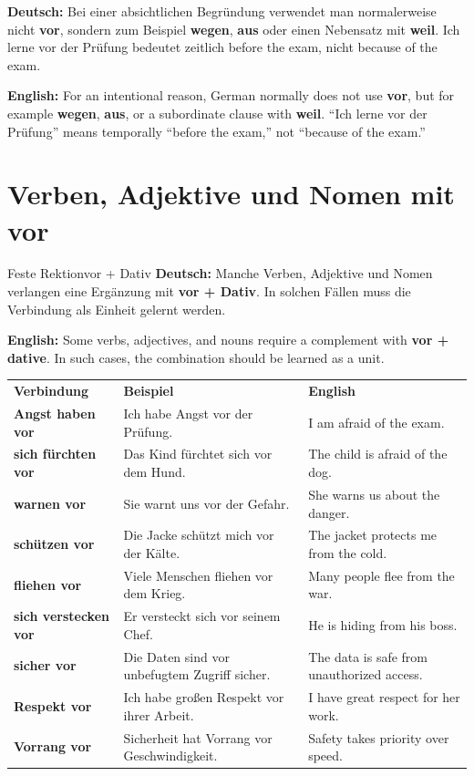 \documentclass[a4paper,11pt]{article}
\newcommand{\GermanText}[1]{\textbf{Deutsch: }#1\par}
\newcommand{\EnglishText}[1]{{\small\color{SoftGray}\textbf{English: }#1\par}}
\begin{document}
        \begin{warningbox}
            \GermanText{Bei einer absichtlichen Begründung verwendet man normalerweise nicht \textbf{vor}, sondern zum Beispiel \textbf{wegen}, \textbf{aus} oder einen Nebensatz mit \textbf{weil}. \glqq Ich lerne vor der Prüfung\grqq{} bedeutet zeitlich \glqq before the exam\grqq, nicht \glqq because of the exam\grqq.}
            \EnglishText{For an intentional reason, German normally does not use \textbf{vor}, but for example \textbf{wegen}, \textbf{aus}, or a subordinate clause with \textbf{weil}. ``Ich lerne vor der Prüfung'' means temporally ``before the exam,'' not ``because of the exam.''}
        \end{warningbox}


    \section{Verben, Adjektive und Nomen mit \glqq vor\grqq}

        \begin{grammarentry}{Feste Rektion}{vor + Dativ}
            \GermanText{Manche Verben, Adjektive und Nomen verlangen eine Ergänzung mit \textbf{vor + Dativ}. In solchen Fällen muss die Verbindung als Einheit gelernt werden.}
            \EnglishText{Some verbs, adjectives, and nouns require a complement with \textbf{vor + dative}. In such cases, the combination should be learned as a unit.}
        \end{grammarentry}

        \begin{longtable}{>{\bfseries}p{4cm}p{5.5cm}p{5.3cm}}
            \rowcolor{HeaderBlueDark}
            \color{white}\textbf{Verbindung} &
            \color{white}\textbf{Beispiel} &
            \color{white}\textbf{English} \\
            Angst haben vor & Ich habe Angst vor der Prüfung. & I am afraid of the exam. \\
            sich fürchten vor & Das Kind fürchtet sich vor dem Hund. & The child is afraid of the dog. \\
            warnen vor & Sie warnt uns vor der Gefahr. & She warns us about the danger. \\
            schützen vor & Die Jacke schützt mich vor der Kälte. & The jacket protects me from the cold. \\
            fliehen vor & Viele Menschen fliehen vor dem Krieg. & Many people flee from the war. \\
            sich verstecken vor & Er versteckt sich vor seinem Chef. & He is hiding from his boss. \\
            sicher vor & Die Daten sind vor unbefugtem Zugriff sicher. & The data is safe from unauthorized access. \\
            Respekt vor & Ich habe großen Respekt vor ihrer Arbeit. & I have great respect for her work. \\
            Vorrang vor & Sicherheit hat Vorrang vor Geschwindigkeit. & Safety takes priority over speed. \\
        \end{longtable}
\end{document}
